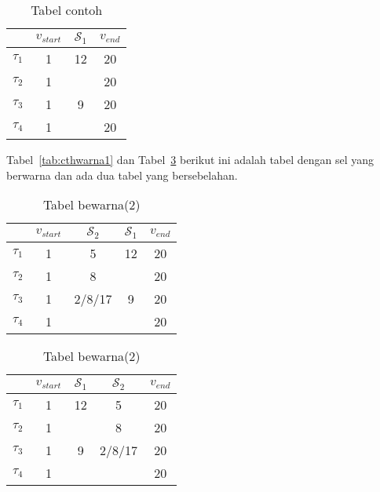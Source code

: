 \begin{table}[H] %
	\centering 
	\caption{Tabel contoh}
	\label{tab:contoh1}
	\begin{tabular}{cccc}
		\toprule
		& $v_{start}$ & $\mathcal{S}_{1}$ & $v_{end}$\\

		\midrule
		$\tau_{1}$ & 1 & 12& 20\\
		$\tau_{2}$ & 1 &  & 20\\
		$\tau_{3}$ & 1 & 9 & 20\\
		$\tau_{4}$ & 1 &  & 20\\

		\bottomrule
		
	\end{tabular} 
\end{table}
Tabel~\ref{tab:cthwarna1} dan Tabel~\ref{tab:cthwarna2} berikut ini adalah tabel dengan sel yang berwarna dan ada dua tabel yang bersebelahan. 
\begin{table}[H]
	\begin{minipage}[c]{0.49\linewidth}
		\centering
		\caption{Tabel bewarna(1)}
		\label{tab:cthwarna1}
		\begin{tabular}{ccccc}
			\toprule
			 & $v_{start}$ & $\mathcal{S}_{2}$ & $\mathcal{S}_{1}$ & $v_{end}$\\
			
			\midrule
			$\tau_{1}$ & 1 & 5 \cellcolor{green}& 12& 20\\
			$\tau_{2}$ & 1 & 8 \cellcolor{green}& & 20\\
			$\tau_{3}$ & 1 & 2/8/17 \cellcolor{green}& 9 & 20\\
			$\tau_{4}$ & 1 & \cellcolor{red}& & 20\\
			
			\bottomrule

		\end{tabular}
	\end{minipage}
	\begin{minipage}[c]{0.49\linewidth}
		
		\centering 
		\caption{Tabel bewarna(2)}
		\label{tab:cthwarna2}
		\begin{tabular}{ccccc}
			\toprule
			 & $v_{start}$ & $\mathcal{S}_{1}$ & $\mathcal{S}_{2}$ & $v_{end}$\\
			
			\midrule
			$\tau_{1}$ & 1 & 12& 5 \cellcolor{red} &20\\
			$\tau_{2}$ & 1 &  &  8 \cellcolor{green} &20\\
			$\tau_{3}$ & 1 & 9 & 2/8/17 \cellcolor{green} &20\\
			$\tau_{4}$ & 1 &   & \cellcolor{red} &20\\
			
			\bottomrule
		
		\end{tabular}
	\end{minipage}
\end{table}

